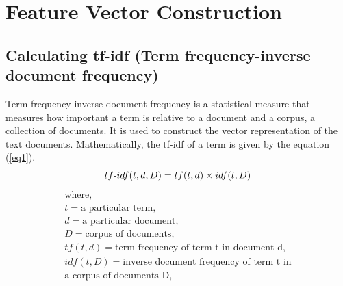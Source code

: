 \documentclass[conference]{IEEEtran}
\begin{document}
\section{Feature Vector Construction}
\subsection {Calculating tf-idf (Term frequency-inverse document frequency)}

Term frequency-inverse document frequency is a statistical measure that
measures how important a term is relative to a document and a corpus, a
collection of documents. It is used to construct the vector representation of
the text documents. Mathematically, the tf-idf of a term is given by the
equation (\ref{eq1}). 
\begin{equation}tf\textnormal{-}idf(t,d, D) = tf(t,d) \times idf(t, D) \label{eq1}
\end{equation}
   \begin{gather*}
  \text{where},\\
  t=\text{a particular term}, \\
  d=\text{a particular document}, \\
  D=\text{corpus of documents}, \\
  tf(t,d)=\text{term frequency of term t in document d}, \\
  idf(t,D)=\text{inverse document frequency of term t in}\\ \text{a corpus of documents D}, \\
\end{gather*}
\end{document}
